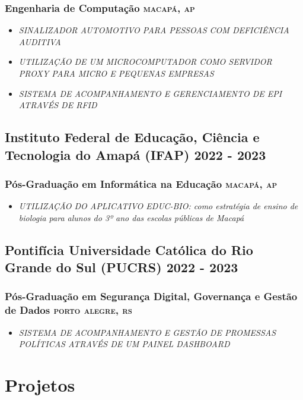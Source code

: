 \documentclass{article}
\newcommand{\rside}[1]{\hfill \normalfont\scshape\MakeLowercase{#1}}
\begin{document}
\subsubsection{Engenharia de Computação \rside{Macapá, AP}}
\begin{itemize}
  \item \textit{SINALIZADOR AUTOMOTIVO PARA PESSOAS COM DEFICIÊNCIA AUDITIVA}
  \item \textit{UTILIZAÇÃO DE UM MICROCOMPUTADOR COMO SERVIDOR PROXY PARA MICRO E PEQUENAS EMPRESAS}
  \item \textit{SISTEMA DE ACOMPANHAMENTO E GERENCIAMENTO DE EPI ATRAVÉS DE RFID}
\end{itemize}
\subsection{Instituto Federal de Educação, Ciência e Tecnologia do Amapá (IFAP) \rside{2022 - 2023}}
\subsubsection{Pós-Graduação em Informática na Educação \rside{Macapá, AP}}
\begin{itemize}
  \item \textit{UTILIZAÇÃO DO APLICATIVO EDUC-BIO: como estratégia de ensino de biologia para alunos do 3º ano das escolas públicas de Macapá}
\end{itemize}
\subsection{Pontifícia Universidade Católica do Rio Grande do Sul (PUCRS) \rside{2022 - 2023}}
\subsubsection{Pós-Graduação em Segurança Digital, Governança e Gestão de Dados \rside{Porto Alegre, RS}}
\begin{itemize}
  \item \textit{SISTEMA DE ACOMPANHAMENTO E GESTÃO DE PROMESSAS POLÍTICAS ATRAVÉS DE UM PAINEL DASHBOARD}
\end{itemize}





\section{\faFlask\enspace Projetos}
\end{document}
